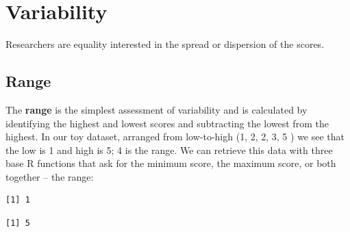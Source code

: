 \documentclass[
  11pt,
]{book}
\newenvironment{Shaded}{\begin{snugshade}}{\end{snugshade}}
\newcommand{\AttributeTok}[1]{\textcolor[rgb]{0.77,0.63,0.00}{#1}}
\newcommand{\ConstantTok}[1]{\textcolor[rgb]{0.00,0.00,0.00}{#1}}
\newcommand{\FunctionTok}[1]{\textcolor[rgb]{0.00,0.00,0.00}{#1}}
\newcommand{\NormalTok}[1]{#1}
\newcommand{\SpecialCharTok}[1]{\textcolor[rgb]{0.00,0.00,0.00}{#1}}
\begin{document}
\hypertarget{variability}{%
\section{Variability}\label{variability}}

Researchers are equality interested in the spread or dispersion of the scores.

\hypertarget{range}{%
\subsection{Range}\label{range}}

The \textbf{range} is the simplest assessment of variability and is calculated by identifying the highest and lowest scores and subtracting the lowest from the highest. In our toy dataset, arranged from low-to-high (1, 2, 2, 3, 5 ) we see that the low is 1 and high is 5; 4 is the range. We can retrieve this data with three base R functions that ask for the minimum score, the maximum score, or both together -- the range:

\begin{Shaded}
\end{Shaded}

\begin{verbatim}
[1] 1
\end{verbatim}

\begin{Shaded}
\end{Shaded}

\begin{verbatim}
[1] 5
\end{verbatim}

\begin{Shaded}
\end{Shaded}
\end{document}
